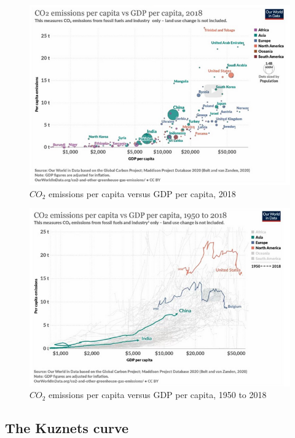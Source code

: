 \documentclass[../summary.tex]{subfiles}
\begin{document}
	\begin{figure}[htbp]
		\centering
		\includegraphics[width=0.9\linewidth]{images/10-emissions-and-GDP-per-capita.png}
		\caption{$CO_{2}$ emissions per capita versus GDP per capita, 2018}
		\label{fig:emissions-and-GDP-per-capita}
	\end{figure}
	
	\begin{figure}[htbp]
		\centering
		\includegraphics[width=0.9\linewidth]{images/10-emissions-and-GDP-per-capita-long-term.png}
		\caption{$CO_{2}$ emissions per capita versus GDP per capita, 1950 to 2018}
		\label{fig:emissions-and-GDP-per-capita-long-term}
	\end{figure}

	\subsection{The Kuznets curve}
	
\end{document}
